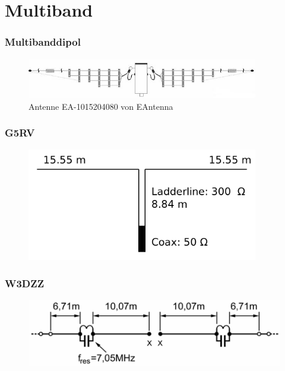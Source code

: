 \section*{Multiband}

\begin{frame}
  \frametitle{Multibanddipol}
  \begin{center}
    \begin{figure}
      \includegraphics[width=0.9\textwidth,height=.75\textheight,keepaspectratio]{a09/Multiband.jpg}
      \caption{Antenne EA-1015204080 von EAntenna}
    \end{figure}
  \end{center}
\end{frame}

\begin{frame}
  \frametitle{G5RV}
  \begin{center}
    \begin{figure}
      \includegraphics[width=0.9\textwidth,height=.75\textheight,keepaspectratio]{a09/G5RV_Antenna.png}
    \end{figure}
  \end{center}
\end{frame}

\begin{frame}
  \frametitle{W3DZZ}
  \begin{center}
    \begin{figure}
      \includegraphics[width=1\textwidth,height=.75\textheight,keepaspectratio]{a09/W3DZZ.png}
    \end{figure}
  \end{center}
\end{frame}

